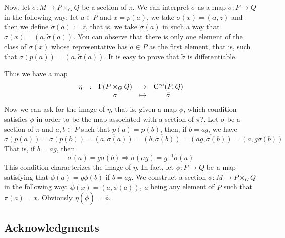 \documentclass[12pt]{article}
\theoremstyle{plain}
\def\Cinfty{{\rm C}^\infty}
\begin{document}
Now, let $\sigma : M \to P \times_G Q$ be a section of $\pi$. We
can interpret $\sigma$ as a map $\tilde \sigma : P \to Q$ in the
following way: let $a \in P$ and $x=p(a)$, we take $\sigma (x) =
\overline{(a,z)}$ and then we define $\tilde \sigma (a) := z$,
that is, we take $\tilde \sigma (a)$ in such a way that $\sigma
(x) = \overline{(a,\tilde \sigma (a))}$. You can observe that
there is only one element of the class of $\sigma (x)$ whose
representative has $a \in P$ as the first element, that is, such
that $\sigma (p(a)) = \overline{(a,\tilde \sigma (a))}$. It is
easy to prove that $\tilde \sigma$ is differentiable.

Thus we have a map
$$
\begin{array}{ccccc}
\eta & : & \Gamma (P \times_G Q) & \to & \Cinfty(P,Q)
\\
& & \sigma & \mapsto & \tilde \sigma
\end{array}
$$
Now we can ask for the image of $\eta$,
that is, given a map $\phi$,
which condition satisfies $\phi$
in order to be the map associated with a section of $\pi$?.
Let $\sigma$ be a section of $\pi$ and
$a,b \in P$ such that $p(a)=p(b)$,
then,
if $b=ag$,
we have
$$
\sigma(p(a))=
\sigma(p(b)) = \overline{(a,\tilde \sigma(a))} =
\overline{(b,\tilde \sigma(b))} =
\overline{(ag,\tilde \sigma(b))} =
\overline{(a,g \sigma(b))}
$$
That is, if $b=ag$, then
$$
\tilde \sigma(a) = g \tilde \sigma(b)
\Rightarrow
\tilde \sigma(ag) = g^{-1} \tilde \sigma(a)
$$
This condition characterizes the image of $\eta$.
In fact, let $\phi : P \to Q$ be a map satisfying that
$\phi (a) = g \phi (b)$ if $b = ag$. We construct a section
$\tilde \phi : M \to P \times_G Q$ in the following way:
$\tilde \phi (x) = \overline{(a,\phi (a))}$, $a$ being any element of
$P$ such that
$\pi (a) = x$. Obviously $\eta (\tilde \phi ) = \phi$.




\subsection*{Acknowledgments}
\end{document}
